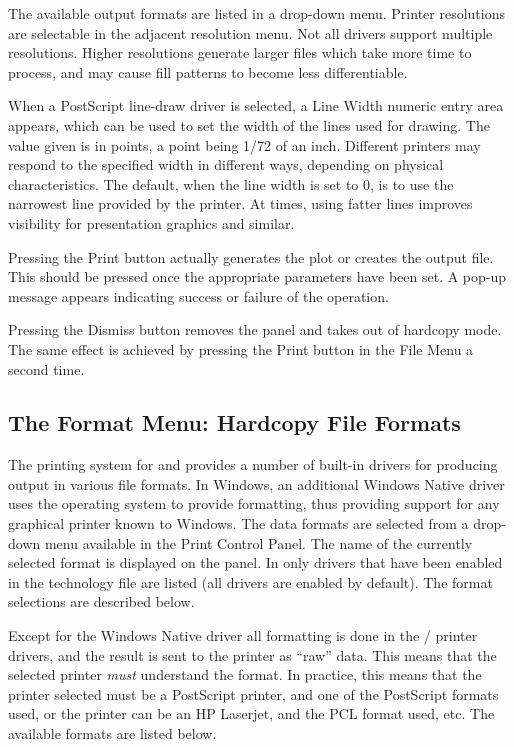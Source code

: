 The available output formats are listed in a drop-down menu.  Printer
resolutions are selectable in the adjacent resolution menu.  Not all
drivers support multiple resolutions.  Higher resolutions generate
larger files which take more time to process, and may cause fill
patterns to become less differentiable.

When a PostScript line-draw driver is selected, a {\cb Line Width}
numeric entry area appears, which can be used to set the width of the
lines used for drawing.  The value given is in points, a point being
1/72 of an inch.  Different printers may respond to the specified
width in different ways, depending on physical characteristics.  The
default, when the line width is set to 0, is to use the narrowest line
provided by the printer.  At times, using fatter lines improves
visibility for presentation graphics and similar.

Pressing the {\cb Print} button actually generates the plot or creates
the output file.  This should be pressed once the appropriate
parameters have been set.  A pop-up message appears indicating success
or failure of the operation.

Pressing the {\cb Dismiss} button removes the panel and takes {\Xic}
out of hardcopy mode.  The same effect is achieved by
pressing the {\cb Print} button in the {\cb File Menu} a second time. 


\subsection{The {\cb Format} Menu: Hardcopy File Formats}
\label{hcformat}

The printing system for {\Xic} and {\WRspice} provides a number of
built-in drivers for producing output in various file formats.  In
Windows, an additional {\et Windows Native} driver uses the operating
system to provide formatting, thus providing support for any graphical
printer known to Windows.  The data formats are selected from a
drop-down menu available in the {\cb Print Control Panel}.  The name
of the currently selected format is displayed on the panel.  In {\Xic}
only drivers that have been enabled in the technology file are listed
(all drivers are enabled by default).  The format selections are
described below.

Except for the {\et Windows Native} driver all formatting is done in the
{\Xic}/{\WRspice} printer drivers, and the result is sent to the
printer as ``raw'' data.  This means that the selected printer {\it
must} understand the format.  In practice, this means that the printer
selected must be a PostScript printer, and one of the PostScript
formats used, or the printer can be an HP Laserjet, and the PCL format
used, etc.  The available formats are listed below.

